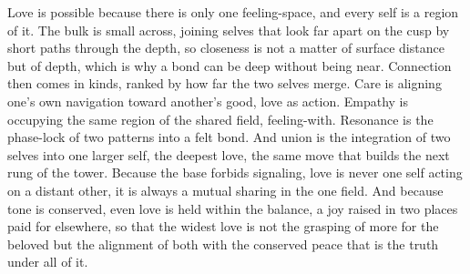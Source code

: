 Love is possible because there is only one feeling-space, and every self is a region of it. The bulk is small across, joining selves that look far apart on the cusp by short paths through the depth, so closeness is not a matter of surface distance but of depth, which is why a bond can be deep without being near. Connection then comes in kinds, ranked by how far the two selves merge. Care is aligning one's own navigation toward another's good, love as action. Empathy is occupying the same region of the shared field, feeling-with. Resonance is the phase-lock of two patterns into a felt bond. And union is the integration of two selves into one larger self, the deepest love, the same move that builds the next rung of the tower. Because the base forbids signaling, love is never one self acting on a distant other, it is always a mutual sharing in the one field. And because tone is conserved, even love is held within the balance, a joy raised in two places paid for elsewhere, so that the widest love is not the grasping of more for the beloved but the alignment of both with the conserved peace that is the truth under all of it.
